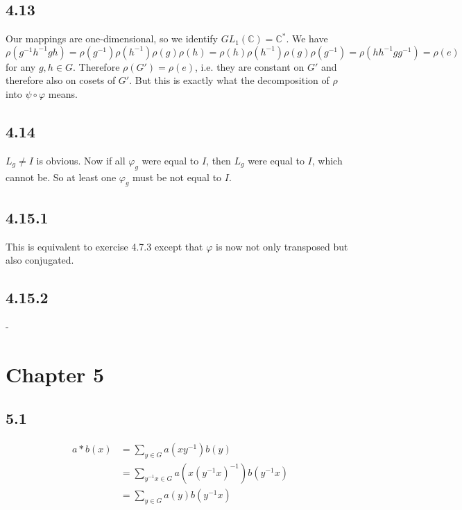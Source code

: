 \documentclass[12pt]{article}
\begin{document}
\subsection*{4.13}

Our mappings are one-dimensional, so we identify $GL_1(\mathbb{C}) = \mathbb{C}^*$. We have $\rho(g^{-1}h^{-1}gh) = \rho(g^{-1})\rho(h^{-1})\rho(g)\rho(h) = \rho(h)\rho(h^{-1})\rho(g)\rho(g^{-1}) = \rho(hh^{-1}gg^{-1}) = \rho(e)$ for any $g, h \in G$. Therefore $\rho(G') = \rho(e)$, i.e. they are constant on $G'$ and therefore also on cosets of $G'$. But this is exactly what the decomposition of $\rho$ into $\psi \circ \varphi$ means.

\subsection*{4.14}

$L_g \neq I$ is obvious. Now if all $\varphi_g$ were equal to $I$, then $L_g$ were equal to $I$, which cannot be. So at least one $\varphi_g$ must be not equal to $I$.

\subsection*{4.15.1}

This is equivalent to exercise 4.7.3 except that $\varphi$ is now not only transposed but also conjugated.

\subsection*{4.15.2}

-



\pagebreak

\section*{Chapter 5}

\subsection*{5.1}

\begin{equation*}
\begin{split}
a * b(x) &= \sum_{y \in G} a(xy^{-1}) b(y) \\
  &= \sum_{y^{-1}x \in G} a(x(y^{-1}x)^{-1}) b(y^{-1}x) \\
  &= \sum_{y \in G} a(y)b(y^{-1}x)
\end{split}
\end{equation*}
\end{document}

